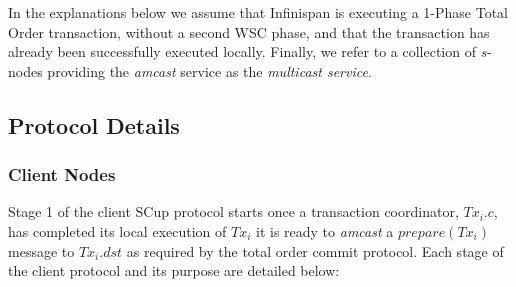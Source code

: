 In the explanations below we assume that Infinispan is executing a 1-Phase Total Order transaction, without a second WSC phase, and that the transaction has already been successfully executed locally.  Finally, we refer to a collection of $s$-nodes providing the \emph{amcast} service as the \emph{multicast service}.  


    \subsection{Protocol Details}
    \subsubsection*{Client Nodes}
    Stage 1 of the client \textsf{SCup} protocol starts once a transaction coordinator, $Tx_i.c$, has completed its local execution of $Tx_i$ it is ready to \emph{amcast} a $prepare(Tx_i)$ message to $Tx_i.dst$ as required by the total order commit protocol.  Each stage of the client protocol and its purpose are detailed below:
